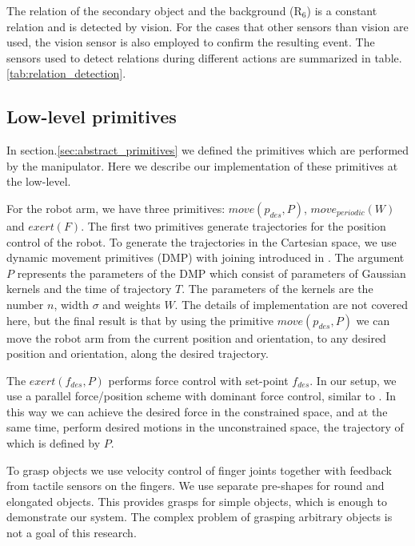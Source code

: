 The relation of the secondary object and the background ($\text{R}_6$) is a constant relation and is detected by vision.
For the cases that other sensors than vision are used, the vision sensor is also employed to confirm the resulting event.
The sensors used to detect relations during different actions are summarized in table.\ref{tab:relation_detection}.

\subsection{Low-level primitives}
\label{section_primitives}
In section.\ref{sec:abstract_primitives} we defined the primitives which are performed by the manipulator.
Here we describe our implementation of these primitives at the low-level.

For the robot arm, we have three primitives: $move(p_{des},P)$, $move_{periodic}(W)$ and $exert(F)$.
The first two primitives generate trajectories for the position control of the robot.
To generate the trajectories in the Cartesian space, we use dynamic movement primitives (DMP) with joining introduced in \cite{Kulvicius2012}.
The argument $P$ represents the parameters of the DMP which consist of parameters of Gaussian kernels and the time of trajectory $T$.
The parameters of the kernels are the number $n$, width $\sigma$ and weights $W$.
The details of implementation are not covered here, but the final result is that by using the primitive $move(p_{des},P)$
we can move the robot arm from the current position and orientation, to any desired position and orientation, along the desired trajectory.

The $exert(f_{des},P)$ performs force control with set-point $f_{des}$.
In our setup, we use a parallel force/position scheme with dominant force control, similar to \cite{chiaverini1993parallel}.
In this way we can achieve the desired force in the constrained space, and at the same time, perform desired motions in the unconstrained space,
the trajectory of which is defined by $P$.


To grasp objects we use velocity control of finger joints together with feedback from tactile sensors on the fingers.
We use separate pre-shapes for round and elongated objects.
This provides grasps for simple objects, which is enough to demonstrate our system.
The complex problem of grasping arbitrary objects is not a goal of this research.


